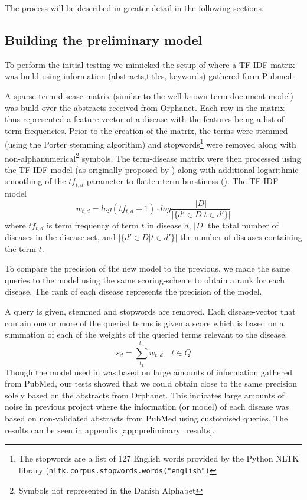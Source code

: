 \documentclass[10pt,letterpaper,final]{article}
\begin{document}
The process will be described in greater detail in the following
sections.


\subsection{Building the preliminary model}
To perform the initial testing we mimicked the setup of
\cite{jensenandersen} where a TF-IDF matrix was build using information
(abstracts,titles, keywords) gathered form Pubmed.

A sparse term-disease matrix (similar to the well-known term-document
model) was build over the abstracts received from Orphanet. Each row in
the matrix thus represented a feature vector of a disease with the
features being a list of term frequencies. Prior to the creation of the
matrix, the terms were stemmed (using the Porter stemming algorithm) and
stopwords\footnote{The stopwords are a list of 127 English words provided
by the Python NLTK library
(\texttt{nltk.corpus.stopwords.words("english")}} were removed along
with non-alphanumerical\footnote{Symbols not represented in the Danish
Alphabet} symbols. The term-disease matrix were then processed using the
TF-IDF model (as originally proposed by \cite{tfidf}) along with
additional logarithmic smoothing of the $tf_{t,d}$-parameter to flatten
term-burstiness (\cite{burstiness}). The TF-IDF model
\[
w_{t,d} = log(tf_{t,d}+1)\cdot log\frac{|D|}{|\{d'\in D|t\in d'\}|}
\]
where $tf_{t,d}$ is term frequency of term $t$ in disease $d$, $|D|$ 
the total number of diseases in the disease set, and $|\{d'\in D|t\in
d'\}|$ the number of diseases containing the term $t$.

To compare the precision of the new model to the previous, we made the
same queries to the model using the same scoring-scheme to obtain a rank
for each disease. The rank of each disease represents the precision of
the model.

A query is given, stemmed and stopwords are removed. Each
disease-vector that contain one or more of the queried terms is given a
score which is based on a summation of each of the weights of the
queried terms relevant to the disease.
\[
s_{d} = \displaystyle\sum\limits_{t_1}^{t_n} w_{t,d}\quad t \in Q
\]
Though the model used in \cite{jensenandersen} was based on large
amounts of information gathered from PubMed, our tests showed that we
could obtain close to the same precision solely based on the abstracts
from Orphanet. This indicates large amounts of noise in previous project
where the information (or model) of each disease was based on
non-validated abstracts from PubMed using customised queries. The
results can be seen in appendix \ref{app:preliminary_results}.
\end{document}
